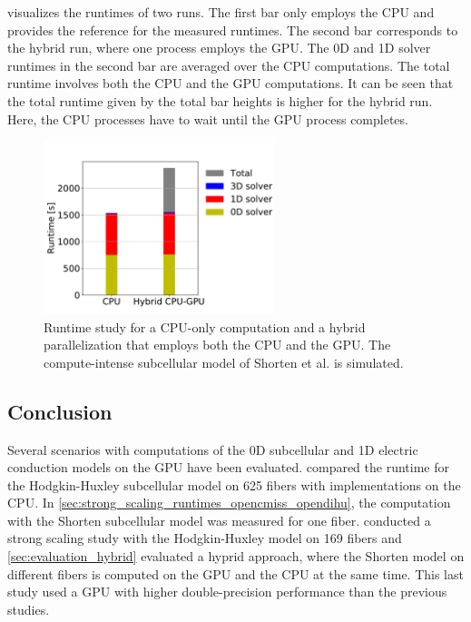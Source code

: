  visualizes the runtimes of two runs. The first bar only employs the CPU and provides the reference for the measured runtimes. The second bar corresponds to the hybrid run, where one process employs the GPU. The 0D and 1D solver runtimes in the second bar are averaged over the CPU computations. The total runtime involves both the CPU and the GPU computations.
It can be seen that the total runtime given by the total bar heights is higher for the hybrid run. Here, the CPU processes have to wait until the GPU process completes.

\begin{figure}
  \centering%
  \includegraphics[width=0.6\textwidth]{images/results/studies/17_shorten_gpu.pdf}%
  \caption{Runtime study for a CPU-only computation and a hybrid parallelization that employs both the CPU and the GPU. The compute-intense subcellular model of Shorten et al. is simulated.}%
  \label{fig:17_shorten_gpu}%
\end{figure}

\subsection{Conclusion}

Several scenarios with computations of the 0D subcellular and 1D electric conduction models on the GPU have been evaluated. 
 compared the runtime for the Hodgkin-Huxley subcellular model on 625 fibers with implementations on the CPU.
In \cref{sec:strong_scaling_runtimes_opencmiss_opendihu}, the computation with the Shorten subcellular model was measured for one fiber.
 conducted a strong scaling study with the Hodgkin-Huxley model on 169 fibers and \cref{sec:evaluation_hybrid} evaluated a hyprid approach, where the Shorten model on different fibers is computed on the GPU and the CPU at the same time. This last study used a GPU with higher double-precision performance than the previous studies.

